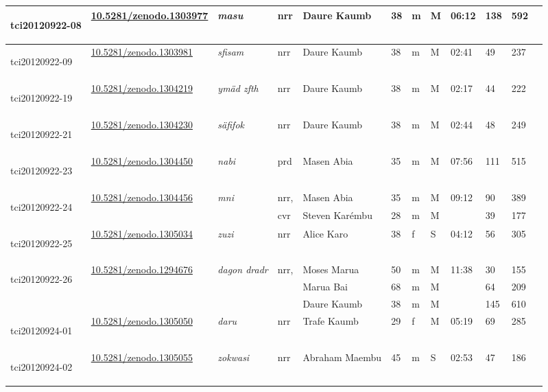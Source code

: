 \begin{landscape}
{\begin{longtable}{p{}lllllllllll}
	\hypertarget{tci20120922-08}{tci20120922-08} &\href{https://zenodo.org/record/1303977}{10.5281/zenodo.1303977}& \emph{masu} & nrr & Daure Kaumb & 38 & m & M & 06:12 & 138&592\\\hline
	\hypertarget{tci20120922-09}{tci20120922-09} &\href{https://zenodo.org/record/1303981}{10.5281/zenodo.1303981}& \emph{sfisam} & nrr & Daure Kaumb & 38 & m & M & 02:41 & 49&237\\\hline
	\hypertarget{tci20120922-19}{tci20120922-19} &\href{https://zenodo.org/record/1304219}{10.5281/zenodo.1304219}& \emph{ymäd zfth} & nrr & Daure Kaumb & 38 & m & M & 02:17 & 44&222\\\hline
	\hypertarget{tci20120922-21}{tci20120922-21} &\href{https://zenodo.org/record/1304230}{10.5281/zenodo.1304230}& \emph{säfifok} & nrr & Daure Kaumb & 38 & m & M & 02:44 & 48&249\\\hline
	\hypertarget{tci20120922-23}{tci20120922-23} &\href{https://zenodo.org/record/1304450}{10.5281/zenodo.1304450}& \emph{nabi} & prd & Masen Abia & 35 & m & M & 07:56 &111&515\\\hline
	\multirow{2}{*}{\hypertarget{tci20120922-24}{tci20120922-24}} &\multirow{2}{*}{\href{https://zenodo.org/record/1304456}{10.5281/zenodo.1304456}}& \multirow{2}{*}{\emph{mni}} &nrr,& Masen Abia & 35 & m & M & \multirow{2}{*}{09:12} & 90&389\\
	&&&cvr&Steven Karémbu & 28 & m & M & &39&177\\\hline
	\hypertarget{tci20120922-25}{tci20120922-25} &\href{https://zenodo.org/record/1305034}{10.5281/zenodo.1305034}& \emph{zuzi} & nrr & Alice Karo & 38 & f & S & 04:12 & 56&305\\\hline
	\multirow{3}{*}{\hypertarget{tci20120922-26}{tci20120922-26}} &\multirow{3}{*}{\href{https://zenodo.org/record/1294676}{10.5281/zenodo.1294676}}& \multirow{3}{*}{\emph{dagon dradr}} & \multirow{2}{*}{nrr,} & Moses Marua & 50 & m & M & \multirow{3}{*}{11:38} & 30&155\\
	&&&\multirow{2}{*}{cvr}&Marua Bai & 68 & m &M &  & 64&209\\
	&&&&Daure Kaumb & 38 & m & M & & 145&610\\\hline
	\hypertarget{tci20120924-01}{tci20120924-01} &\href{https://zenodo.org/record/1305050}{10.5281/zenodo.1305050}& \emph{daru} & nrr & Trafe Kaumb & 29 & f & M & 05:19 & 69&285\\\hline
	\hypertarget{tci20120924-02}{tci20120924-02} &\href{https://zenodo.org/record/1305055}{10.5281/zenodo.1305055}& \emph{zokwasi} & nrr & Abraham Maembu & 45 & m & S & 02:53 & 47&186\\\hline

\end{longtable}}
\end{landscape}
